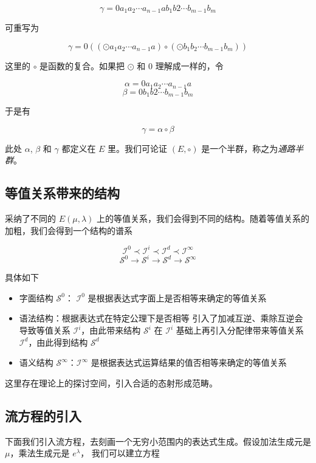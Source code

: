 \documentclass[a4paper,12pt]{article}
\numberwithin{problem}{section}
\numberwithin{definition}{section}
\numberwithin{lemma}{section}
\numberwithin{proposition}{section}
\numberwithin{theorem}{section}
\numberwithin{grammar}{section}
\numberwithin{program}{section}
\numberwithin{convention}{section}
\numberwithin{corollary}{section}
\begin{document}
$$\gamma = 0 a_1 a_2 \cdots a_{n-1} a b_1 b2 \cdots b_{m-1} b_m$$

可重写为

$$\gamma = 0 ((\odot a_1 a_2 \cdots a_{n-1} a) \circ (\odot b_1 b_2 \cdots b_{m-1} b_m))$$

这里的 $\circ$ 是函数的复合。如果把 $\odot$ 和 $0$ 理解成一样的，令

$$\alpha = 0 a_1 a_2 \cdots a_{n-1} a$$
$$\beta = 0 b_1 b2 \cdots b_{m-1} b_m$$

于是有

$$\gamma = \alpha \circ \beta$$

此处 $\alpha$, $\beta$ 和 $\gamma$ 都定义在 $E$ 里。我们可论证 $(E, \circ)$ 是一个半群，称之为\emph{通路半群}。

\subsection{等值关系带来的结构}

采纳了不同的 $E(\mu, \lambda)$ 上的等值关系，我们会得到不同的结构。随着等值关系的加粗，我们会得到一个结构的谱系

$$
  \mathcal{I}^0 \prec \mathcal{I}^i \prec \mathcal{I}^d \prec \mathcal{I}^\infty
$$
$$
  \mathcal{S}^0 \to \mathcal{S}^i \to \mathcal{S}^d \to \mathcal{S}^\infty
$$

具体如下

\begin{itemize}
    \item 字面结构 $\mathcal{S}^0$： $\mathcal{I}^0$ 是根据表达式字面上是否相等来确定的等值关系
    \item 语法结构：根据表达式在特定公理下是否相等
        \subitem 引入了加减互逆、乘除互逆会导致等值关系 $\mathcal{I}^i$，由此带来结构 $\mathcal{S}^i$
        \subitem 在 $\mathcal{I}^i$ 基础上再引入分配律带来等值关系 $\mathcal{I}^d$，由此得到结构 $\mathcal{S}^d$
    \item 语义结构 $\mathcal{S}^\infty$：$\mathcal{I}^\infty$ 是根据表达式运算结果的值否相等来确定的等值关系
\end{itemize}

这里存在理论上的探讨空间，引入合适的态射形成范畴。

\subsection{流方程的引入}
\label{sec:floweq}

下面我们引入流方程，去刻画一个无穷小范围内的表达式生成。假设加法生成元是 $\mu$，乘法生成元是 $e^\lambda$， 我们可以建立方程
\end{document}
